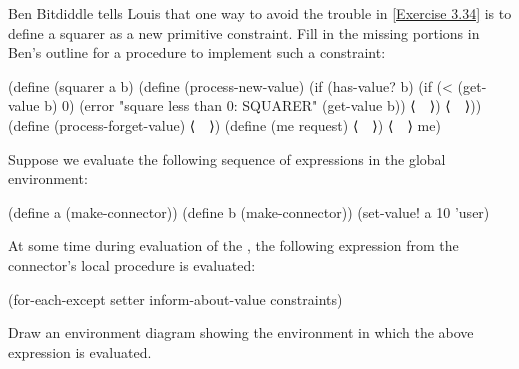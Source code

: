 \begin{exercise}
	\label{Exercise 3.35}
	Ben Bitdiddle tells Louis that one way to avoid the trouble in \cref{Exercise 3.34} is to define a squarer as a new primitive constraint.
	Fill in the missing portions in Ben’s outline for a procedure to implement such a constraint:
	\begin{scheme}
	  (define (squarer a b)
	    (define (process-new-value)
	      (if (has-value? b)
	          (if (< (get-value b) 0)
	              (error "square less than 0: SQUARER"
	                     (get-value b))
	              ⟨~~⟩)
	          ⟨~~⟩))
	    (define (process-forget-value) ⟨~~⟩)
	    (define (me request) ⟨~~⟩)
	    ⟨~~⟩
	    me)
	\end{scheme}
\end{exercise}



\begin{exercise}
	\label{Exercise 3.36}
	Suppose we evaluate the following sequence of expressions in the global environment:
	\begin{scheme}
	  (define a (make-connector))
	  (define b (make-connector))
	  (set-value! a 10 'user)
	\end{scheme}
	At some time during evaluation of the , the following expression from the connector’s local procedure is evaluated:
	\begin{scheme}
	  (for-each-except
	    setter inform-about-value constraints)
	\end{scheme}
	Draw an environment diagram showing the environment in which the above expression is evaluated.
\end{exercise}



